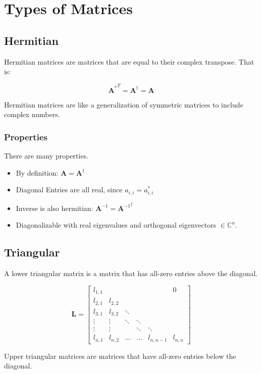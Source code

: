 \section{Types of Matrices}

\subsection{Hermitian}
Hermitian matrices are matrices that are equal to their complex transpose. That is:

\begin{equation}
{\mathbf{A}^{*}}^T = \mathbf{A}^\dagger = \mathbf{A} 
\end{equation}

Hermitian matrices are like a generalization of symmetric matrices to include complex numbers. 

\subsubsection{Properties}
There are many properties. 
\begin{itemize}
\item By definition: $\mathbf{A} = \mathbf{A}^\dagger$
\item Diagonal Entries are all real, since $a_{i,i} = a_{i,i}^*$
\item Inverse is also hermitian:  $\mathbf{A}^{-1} ={ \mathbf{A}^{-1}}^\dagger$
\item Diagonalizable with real eigenvalues and orthogonal eigenvectors $\in \mathbb{C}^n$.
\end{itemize}


\subsection{Triangular}
A lower triangular matrix is a matrix that has all-zero entries above the diagonal.

\begin{equation}
\mathbf{L} = \left[\begin{array}{cccccc} l_{1,1}&&&&&0\\l_{2,1}&l_{2,2}&&&&\\l_{3,1}&l_{3,2}&\ddots&&&\\  \vdots&\vdots&\ddots&\ddots&&\\ \vdots&\vdots&&\ddots&\ddots&\\  l_{n,1}&l_{n,2}&\hdots&\hdots&l_{n,n-1}&l_{n,n}\end{array}\right]
\end{equation}

Upper triangular matrices are matrices that have all-zero entries below the diagonal.


